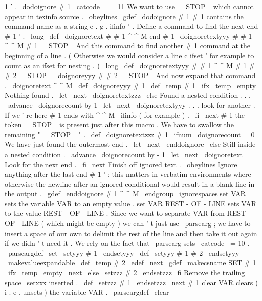 {{1
'
.
\
dodoignore
{
#
1
}
%
}
{
\
catcode
_
=
11
%
We
want
to
use
\
_STOP_
which
cannot
appear
in
texinfo
source
.
\
obeylines
%
%
\
gdef
\
dodoignore
#
1
{
%
%
#
1
contains
the
command
name
as
a
string
e
.
g
.
ifinfo
'
.
%
%
Define
a
command
to
find
the
next
end
#
1
'
.
\
long
\
def
\
doignoretext
#
#
1
^
^
M
end
#
1
{
%
\
doignoretextyyy
#
#
1
^
^
M
#
1
\
_STOP_
}
%
%
%
And
this
command
to
find
another
#
1
command
at
the
beginning
of
a
%
line
.
(
Otherwise
we
would
consider
a
line
c
ifset
'
for
%
example
to
count
as
an
ifset
for
nesting
.
)
\
long
\
def
\
doignoretextyyy
#
#
1
^
^
M
#
1
#
#
2
\
_STOP_
{
\
doignoreyyy
{
#
#
2
}
\
_STOP_
}
%
%
%
And
now
expand
that
command
.
\
doignoretext
^
^
M
%
}
%
}
\
def
\
doignoreyyy
#
1
{
%
\
def
\
temp
{
#
1
}
%
\
ifx
\
temp
\
empty
%
Nothing
found
.
\
let
\
next
\
doignoretextzzz
\
else
%
Found
a
nested
condition
.
.
.
\
advance
\
doignorecount
by
1
\
let
\
next
\
doignoretextyyy
%
.
.
.
look
for
another
.
%
If
we
'
re
here
#
1
ends
with
^
^
M
\
ifinfo
(
for
example
)
.
\
fi
\
next
#
1
%
the
token
\
_STOP_
is
present
just
after
this
macro
.
}
%
We
have
to
swallow
the
remaining
"
\
_STOP_
"
.
%
\
def
\
doignoretextzzz
#
1
{
%
\
ifnum
\
doignorecount
=
0
%
We
have
just
found
the
outermost
end
.
\
let
\
next
\
enddoignore
\
else
%
Still
inside
a
nested
condition
.
\
advance
\
doignorecount
by
-
1
\
let
\
next
\
doignoretext
%
Look
for
the
next
end
.
\
fi
\
next
}
%
Finish
off
ignored
text
.
{
\
obeylines
%
%
Ignore
anything
after
the
last
end
#
1
'
;
this
matters
in
verbatim
%
environments
where
otherwise
the
newline
after
an
ignored
conditional
%
would
result
in
a
blank
line
in
the
output
.
\
gdef
\
enddoignore
#
1
^
^
M
{
\
endgroup
\
ignorespaces
}
%
}
%
set
VAR
sets
the
variable
VAR
to
an
empty
value
.
%
set
VAR
REST
-
OF
-
LINE
sets
VAR
to
the
value
REST
-
OF
-
LINE
.
%
%
Since
we
want
to
separate
VAR
from
REST
-
OF
-
LINE
(
which
might
be
%
empty
)
we
can
'
t
just
use
\
parsearg
;
we
have
to
insert
a
space
of
our
%
own
to
delimit
the
rest
of
the
line
and
then
take
it
out
again
if
we
%
didn
'
t
need
it
.
%
We
rely
on
the
fact
that
\
parsearg
sets
\
catcode
\
=
10
.
%
\
parseargdef
\
set
{
\
setyyy
#
1
\
endsetyyy
}
\
def
\
setyyy
#
1
#
2
\
endsetyyy
{
%
{
%
\
makevalueexpandable
\
def
\
temp
{
#
2
}
%
\
edef
\
next
{
\
gdef
\
makecsname
{
SET
#
1
}
}
%
\
ifx
\
temp
\
empty
\
next
{
}
%
\
else
\
setzzz
#
2
\
endsetzzz
\
fi
}
%
}
%
Remove
the
trailing
space
\
setxxx
inserted
.
\
def
\
setzzz
#
1
\
endsetzzz
{
\
next
{
#
1
}
}
%
clear
VAR
clears
(
i
.
e
.
unsets
)
the
variable
VAR
.
%
\
parseargdef
\
clear
{
%
{
}}}
